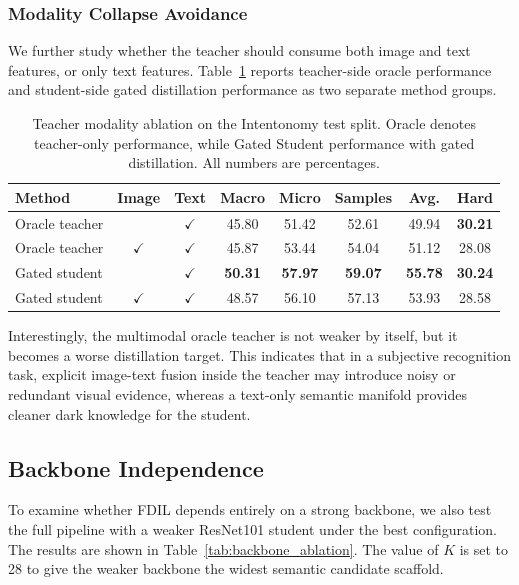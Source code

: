 \subsubsection{Modality Collapse Avoidance}

We further study whether the teacher should consume both image and text features, or only text features. Table~\ref{tab:teacher_modality_ablation} reports teacher-side oracle performance and student-side gated distillation performance as two separate method groups.
\begin{table}[t]
\centering
\caption{Teacher modality ablation on the Intentonomy test split. Oracle denotes teacher-only performance, while Gated Student performance with gated distillation. All numbers are percentages.}
\label{tab:teacher_modality_ablation}
\begin{tabular}{lccccccc}
\hline
Method & Image & Text & Macro & Micro & Samples & Avg. & Hard \\
\hline
Oracle teacher &  & $\checkmark$ & 45.80 & 51.42 & 52.61 & 49.94 & \textbf{30.21} \\
Oracle teacher & $\checkmark$ & $\checkmark$ & 45.87 & 53.44 & 54.04 & 51.12 & 28.08 \\
\hline
Gated student &  & $\checkmark$ & \textbf{50.31} & \textbf{57.97} & \textbf{59.07} & \textbf{55.78} & \textbf{30.24} \\
Gated student & $\checkmark$ & $\checkmark$ & 48.57 & 56.10 & 57.13 & 53.93 & 28.58 \\
\hline
\end{tabular}
\end{table}

Interestingly, the multimodal oracle teacher is not weaker by itself, but it becomes a worse distillation target. This indicates that in a subjective recognition task, explicit image-text fusion inside the teacher may introduce noisy or redundant visual evidence, whereas a text-only semantic manifold provides cleaner dark knowledge for the student.

\subsection{Backbone Independence}

To examine whether FDIL depends entirely on a strong backbone, we also test the full pipeline with a weaker ResNet101 student under the best configuration. The results are shown in Table~\ref{tab:backbone_ablation}. The value of $K$ is set to 28 to give the weaker backbone the widest semantic candidate scaffold.

